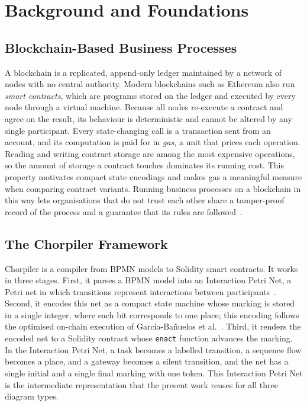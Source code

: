 \documentclass[runningheads]{llncs}
\begin{document}
\section{Background and Foundations}
\label{sec:background}

\subsection{Blockchain-Based Business Processes}
A blockchain is a replicated, append-only ledger maintained by a network of nodes with no central authority. Modern blockchains such as Ethereum also run \emph{smart contracts}, which are programs stored on the ledger and executed by every node through a virtual machine. Because all nodes re-execute a contract and agree on the result, its behaviour is deterministic and cannot be altered by any single participant. Every state-changing call is a transaction sent from an account, and its computation is paid for in \emph{gas}, a unit that prices each operation. Reading and writing contract storage are among the most expensive operations, so the amount of storage a contract touches dominates its running cost. This property motivates compact state encodings and makes gas a meaningful measure when comparing contract variants. Running business processes on a blockchain in this way lets organisations that do not trust each other share a tamper-proof record of the process and a guarantee that its rules are followed~\cite{garcia}.

\subsection{The Chorpiler Framework}
Chorpiler is a compiler from BPMN models to Solidity smart contracts. It works in three stages. First, it parses a BPMN model into an Interaction Petri Net, a Petri net in which transitions represent interactions between participants~\cite{decker}. Second, it encodes this net as a compact state machine whose marking is stored in a single integer, where each bit corresponds to one place; this encoding follows the optimised on-chain execution of García-Bañuelos et al.~\cite{garcia}. Third, it renders the encoded net to a Solidity contract whose \texttt{enact} function advances the marking. In the Interaction Petri Net, a task becomes a labelled transition, a sequence flow becomes a place, and a gateway becomes a silent transition, and the net has a single initial and a single final marking with one token. This Interaction Petri Net is the intermediate representation that the present work reuses for all three diagram types.
\end{document}
